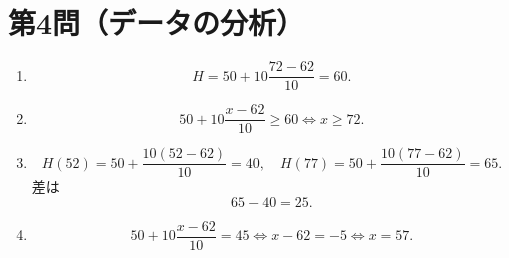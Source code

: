 \documentclass[a4paper,12pt]{jsarticle}
\begin{document}
\section*{第4問（データの分析）}
\begin{enumerate}[label=\arabic*.]
  \item
  \[
  H=50+10\frac{72-62}{10}=60.
  \]
  \item
  \[
  50+10\frac{x-62}{10}\ge60
  \iff x\ge72.
  \]
  \item
  \[
  H(52)=50+\frac{10(52-62)}{10}=40,
  \quad
  H(77)=50+\frac{10(77-62)}{10}=65.
  \]
  差は
  \[
  65-40=25.
  \]
  \item
  \[
  50+10\frac{x-62}{10}=45
  \iff x-62=-5
  \iff x=57.
  \]
\end{enumerate}
\end{document}
